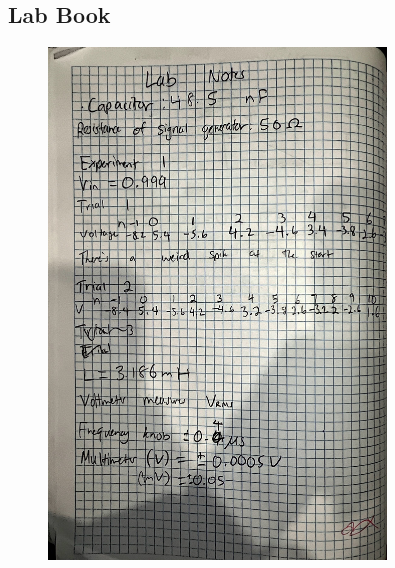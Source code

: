 \documentclass{article}
\begin{document}
\subsection{Lab Book}
\begin{figure}[H]
    \centering
    \includegraphics[width=0.8\textwidth]{labbook.pdf}
\end{figure}
\end{document}
